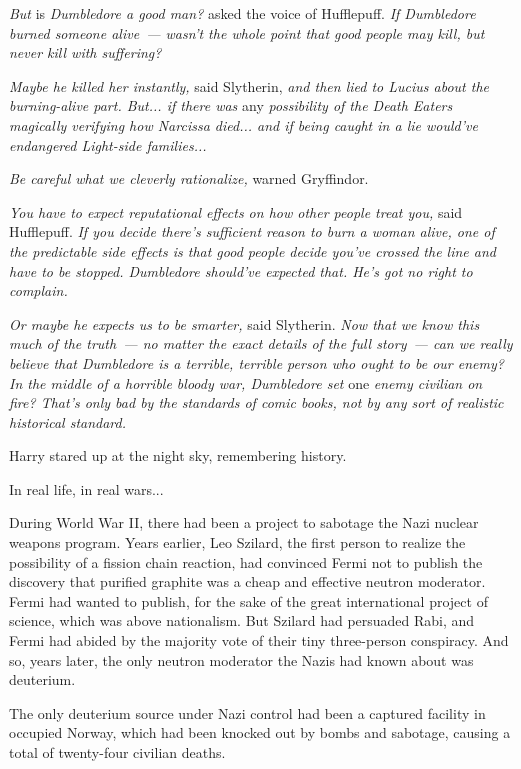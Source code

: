 \emph{But} is \emph{Dumbledore a good man?} asked the voice of Hufflepuff. \emph{If Dumbledore burned someone alive~--- wasn't the whole point that good people may kill, but never kill with suffering?}

\emph{Maybe he killed her instantly,} said Slytherin, \emph{and then lied to Lucius about the burning-alive part. But... if there was} any \emph{possibility of the Death Eaters magically verifying how Narcissa died... and if being caught in a lie would've endangered Light-side families...}

\emph{Be careful what we cleverly rationalize,} warned Gryffindor.

\emph{You have to expect reputational effects on how other people treat you,} said Hufflepuff. \emph{If you decide there's sufficient reason to burn a woman alive, one of the predictable side effects is that good people decide you've crossed the line and have to be stopped. Dumbledore should've expected that. He's got no right to complain.}

\emph{Or maybe he expects us to be smarter,} said Slytherin. \emph{Now that we know this much of the truth~--- no matter the exact details of the full story~--- can we really believe that Dumbledore is a terrible, terrible person who ought to be our enemy? In the middle of a horrible bloody war, Dumbledore set} one \emph{enemy civilian on fire? That's only bad by the standards of comic books, not by any sort of realistic historical standard.}

Harry stared up at the night sky, remembering history.

In real life, in real wars...

During World War II, there had been a project to sabotage the Nazi nuclear weapons program. Years earlier, Leo Szilard, the first person to realize the possibility of a fission chain reaction, had convinced Fermi not to publish the discovery that purified graphite was a cheap and effective neutron moderator. Fermi had wanted to publish, for the sake of the great international project of science, which was above nationalism. But Szilard had persuaded Rabi, and Fermi had abided by the majority vote of their tiny three-person conspiracy. And so, years later, the only neutron moderator the Nazis had known about was deuterium.

The only deuterium source under Nazi control had been a captured facility in occupied Norway, which had been knocked out by bombs and sabotage, causing a total of twenty-four civilian deaths.

